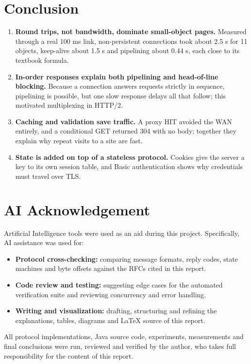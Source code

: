 \documentclass[11pt,a4paper]{article}
\begin{document}
\section{Conclusion}
\begin{enumerate}[leftmargin=2em]
    \item \textbf{Round trips, not bandwidth, dominate small-object pages.} Measured through a real 100 ms link, non-persistent connections took about 2.5 s for 11 objects, keep-alive about 1.5 s and pipelining about 0.44 s, each close to its textbook formula.
    \item \textbf{In-order responses explain both pipelining and head-of-line blocking.} Because a connection answers requests strictly in sequence, pipelining is possible, but one slow response delays all that follow; this motivated multiplexing in HTTP/2.
    \item \textbf{Caching and validation save traffic.} A proxy HIT avoided the WAN entirely, and a conditional GET returned 304 with no body; together they explain why repeat visits to a site are fast.
    \item \textbf{State is added on top of a stateless protocol.} Cookies give the server a key to its own session table, and Basic authentication shows why credentials must travel over TLS.
\end{enumerate}

\section*{AI Acknowledgement}
Artificial Intelligence tools were used as an aid during this project. Specifically, AI assistance was used for:
\begin{itemize}[leftmargin=2em]
    \item \textbf{Protocol cross-checking:} comparing message formats, reply codes, state machines and byte offsets against the RFCs cited in this report.
    \item \textbf{Code review and testing:} suggesting edge cases for the automated verification suite and reviewing concurrency and error handling.
    \item \textbf{Writing and visualization:} drafting, structuring and refining the explanations, tables, diagrams and \LaTeX{} source of this report.
\end{itemize}
All protocol implementations, Java source code, experiments, measurements and final conclusions were run, reviewed and verified by the author, who takes full responsibility for the content of this report.
\end{document}
